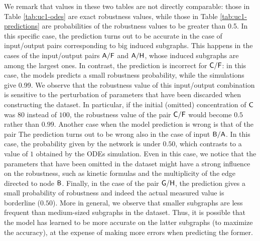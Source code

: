 We remark that values in these two tables are not directly comparable: those in Table \ref{tab:uc1-odes} are exact robustness values, while those in Table \ref{tab:uc1-predictions} are probabilities of the robustness values to be greater than 0.5. In this specific case, the prediction turns out to be accurate in the case of input/output pairs corresponding to big induced subgraphs. This happens in the cases of the input/output pairs $\mathsf{A}/\mathsf{F}$ and $\mathsf{A}/\mathsf{H}$, whose induced subgraphs are among the largest ones. In contrast, the prediction is incorrect for $\mathsf{C}/\mathsf{F}$: in this case, the models predicts a small robustness probability, while the simulations give 0.99. We observe that the robustness value of this input/output combination is sensitive to the perturbation of parameters that have been discarded when constructing the dataset. In particular, if the initial (omitted) concentration of $\mathsf{C}$ was $80$ instead of $100$, the robustness value of the pair $\mathsf{C}/\mathsf{F}$ would become $0.5$ rather than $0.99$. Another case when the model prediction is wrong is that of the pair The prediction turns out to be wrong also in the case of input $\mathsf{B}/\mathsf{A}$. In this case, the probability given by the network is under $0.50$, which contrasts to a value of $1$ obtained by the ODEs simulation. Even in this case, we notice that the parameters that have been omitted in the dataset might have a strong influence on the robustness, such as kinetic formulas and the multiplicity of the edge directed to node $\mathsf{B}$. Finally, in the case of the pair $\mathsf{G}/\mathsf{H}$, the prediction gives a small probability of robustness and indeed the actual measured value is borderline ($0.50$). More in general, we observe that smaller subgraphs are less frequent than medium-sized subgraphs in the dataset. Thus, it is possible that the model has learned to be more accurate on the latter subgraphs (to maximize the accuracy), at the expense of making more errors when predicting the former.


